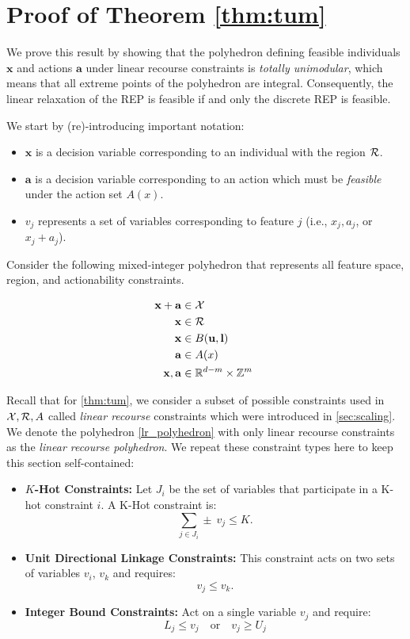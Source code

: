 \section{Proof of Theorem \ref{thm:tum}} \label{app:tum_pf}
%
We prove this result by showing that the polyhedron defining feasible individuals $\mathbf{x}$ and actions $\mathbf{a}$ under linear recourse constraints is \emph{totally unimodular}, which means that all extreme points of the polyhedron are integral. 
Consequently, the linear relaxation of the REP is feasible 
if and only the discrete REP is feasible.

We start by (re)-introducing important notation:
\begin{itemize}
    \item $\mathbf{x}$ is a decision variable corresponding to an individual with the region ${\cal R}$.
    \item $\mathbf{a}$ is a decision variable corresponding to an action which must be \emph{feasible} under the action set $A(x)$.
    \item $v_j$ represents a set of variables corresponding to feature $j$ (i.e., $x_j, a_j$, or $x_j+a_j$). 
\end{itemize}

Consider the following mixed-integer polyhedron that represents all feature space, region, and actionability constraints. 

\begin{subequations} \label{lr_polyhedron}
\begin{align}
	&& \mathbf{x} + \mathbf{a} &\in {\cal X} && \\
	&& \mathbf{x} &\in {\cal R} && \\
	&& \mathbf{x} &\in B(\mathbf{u}, \mathbf{l}) && \ \\
	&& \mathbf{a} &\in A(x) &&  \\
	&& \mathbf{x}, \mathbf{a} &\in \mathbb{R}^{d-m} \times \mathbb{Z}^m 
\end{align}
\end{subequations}

Recall that for \cref{thm:tum}, we consider a subset of possible constraints used in ${\cal X}, {\cal R}, A$ called \emph{linear recourse} constraints which were introduced in \cref{sec:scaling}. We denote the polyhedron \ref{lr_polyhedron} with only linear recourse constraints as the \emph{linear recourse polyhedron}. We repeat these constraint types here to keep this section self-contained:
\begin{itemize}
\item \textbf{$K$-Hot Constraints:} Let $J_i$ be the set of variables that participate in a K-hot constraint $i$. A K-Hot constraint is:
$$
\sum_{j \in J_i}  \pm~v_j \leq K.
$$
\item \textbf{Unit Directional Linkage Constraints:} This constraint acts on two sets of variables $v_i$, $v_k$ and requires:
$$
v_{j} \leq v_{k}.
$$
\item \textbf{Integer Bound Constraints: } Act on a single variable $v_j$ and require:
$$
L_j \leq  v_j \quad\text{or}\quad v_j \geq U_j
$$
\end{itemize}

